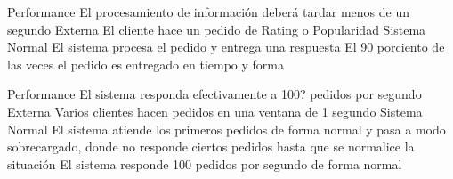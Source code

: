 \begin{enumerate}
\QA
  {Performance} %
  {El procesamiento de información deberá tardar menos de un segundo} %
  {Externa} %
  {El cliente hace un pedido de Rating o Popularidad} %
  {Sistema} %
  {Normal} %
  {El sistema procesa el pedido y entrega una respuesta} %
  {El 90 porciento de las veces el pedido es entregado en tiempo y forma} %

\QA
  {Performance} %
  {El sistema responda efectivamente a 100? pedidos por segundo} %
  {Externa} %
  {Varios clientes hacen pedidos en una ventana de 1 segundo} %
  {Sistema} %
  {Normal} %
  {El sistema atiende los primeros pedidos de forma normal y pasa a modo sobrecargado, donde no responde ciertos pedidos hasta que se normalice la situación} %
  {El sistema responde 100 pedidos por segundo de forma normal} %



\end{enumerate}

